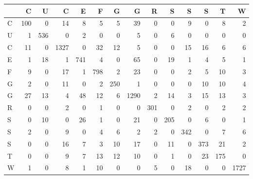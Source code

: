 \begin{tabular}{lrrrrrrrrrrrrr}
\toprule
{} &    C &    U &     C &    E &    F &    G &     G &    R &    S &    S &    S &    T &     W \\
\midrule
C &  100 &    0 &    14 &    8 &    5 &    5 &    39 &    0 &    0 &    9 &    0 &    8 &     2 \\
U &    1 &  536 &     0 &    2 &    0 &    0 &     5 &    0 &    6 &    0 &    0 &    0 &     0 \\
C &   11 &    0 &  1327 &    0 &   32 &   12 &     5 &    0 &    0 &   15 &   16 &    6 &     6 \\
E &    1 &   18 &     1 &  741 &    4 &    0 &    65 &    0 &   19 &    1 &    4 &    5 &     1 \\
F &    9 &    0 &    17 &    1 &  798 &    2 &    23 &    0 &    0 &    2 &    5 &   10 &     3 \\
G &    2 &    0 &    11 &    0 &    2 &  250 &     1 &    0 &    0 &    0 &   10 &   10 &     4 \\
G &   27 &   13 &     4 &   48 &   12 &    6 &  1290 &    2 &   14 &    3 &   15 &   13 &     3 \\
R &    0 &    0 &     2 &    0 &    1 &    0 &     0 &  301 &    0 &    2 &    0 &    2 &     2 \\
S &    0 &   10 &     0 &   26 &    1 &    0 &    21 &    0 &  205 &    0 &    6 &    0 &     1 \\
S &    2 &    0 &     9 &    0 &    4 &    6 &     2 &    2 &    0 &  342 &    0 &    7 &     6 \\
S &    0 &    0 &    16 &    7 &    3 &   10 &    17 &    0 &   11 &    0 &  373 &   21 &     2 \\
T &    0 &    0 &     9 &    7 &   13 &   12 &    10 &    0 &    1 &    0 &   23 &  175 &     0 \\
W &    1 &    0 &     8 &    1 &   10 &    0 &     0 &    5 &    0 &   18 &    0 &    0 &  1727 \\
\bottomrule
\end{tabular}
